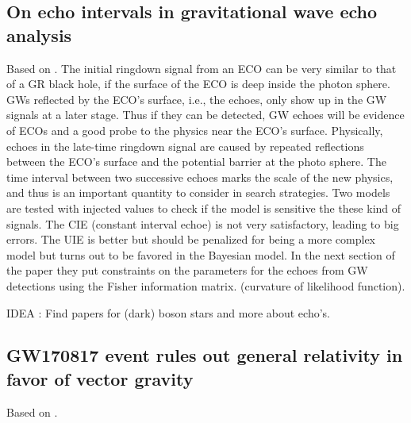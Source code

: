 \documentclass[12 pt]{article}
\begin{document}
	\subsection{On echo intervals in gravitational wave echo analysis}
	Based on \cite{echoe}.
	The initial ringdown signal from an ECO can be very similar to that of a GR black hole, if the surface of the ECO is deep inside the photon sphere. GWs reflected by the ECO’s surface, i.e., the echoes, only show up in the GW signals at a later stage. Thus if they can be detected, GW echoes will be
	evidence of ECOs and a good probe to the physics near the ECO’s surface. Physically, echoes in the late-time ringdown signal are caused by repeated reflections between the ECO’s surface
	and the potential barrier at the photo sphere. The time interval between two successive echoes marks the scale of the new physics, and thus is an important quantity to consider in search strategies. Two models are tested with injected values to check if the model is sensitive the these kind of signals. The CIE (constant interval echoe) is not very satisfactory, leading to big errors. The UIE is better but should be penalized for being a more complex model but turns out to be favored in the Bayesian model. In the next section of the paper they put constraints on the parameters for the echoes from GW detections using the Fisher information matrix. (curvature of likelihood function). 
	
	IDEA : Find papers for (dark) boson stars and more about echo's. 
	
	\subsection{GW170817 event rules out general relativity in favor of vector gravity}
	Based on \cite{GW170817}. 
	
	
	
	
	
	
	
	
\end{document}
